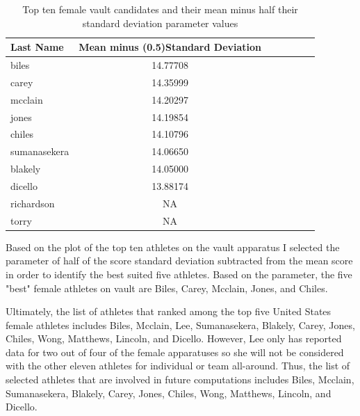 \documentclass[12pt]{article}
\begin{document}
\begin{table}
  \caption{Top ten female vault candidates and their mean minus half their standard deviation parameter values}
  \label{tab:tableVTP}
\centering
\begin{tabular}[t]{lccllll}
 \toprule
Last Name & Mean minus (0.5)Standard Deviation\\
\midrule
biles & 14.77708\\
\midrule
carey & 14.35999\\
\midrule
mcclain & 14.20297\\
\midrule
jones & 14.19854\\
\midrule
chiles & 14.10796\\
\midrule
sumanasekera & 14.06650\\
\midrule
blakely & 14.05000\\
\midrule
dicello & 13.88174\\
\midrule
richardson & NA\\
\midrule
torry & NA\\
\bottomrule
\end{tabular}
\end{table}

Based on the plot of the top ten athletes on the vault apparatus I selected the parameter of 
half of the score standard deviation subtracted from the mean score in order to identify the best suited five 
athletes. Based on the parameter, the five "best" female athletes on vault are Biles, Carey, Mcclain, Jones, 
and Chiles.

Ultimately, the list of athletes that ranked among the top five United States female athletes includes Biles, 
Mcclain, Lee, Sumanasekera, Blakely, Carey, Jones, Chiles, Wong, Matthews, Lincoln, and Dicello. However, Lee 
only has reported data for two out of four of the female apparatuses so she will not be considered with the other 
eleven athletes for individual or team all-around. Thus, the list of selected athletes that are involved in future 
computations includes Biles, Mcclain, Sumanasekera, Blakely, Carey, Jones, Chiles, Wong, Matthews, Lincoln, 
and Dicello.
\end{document}

